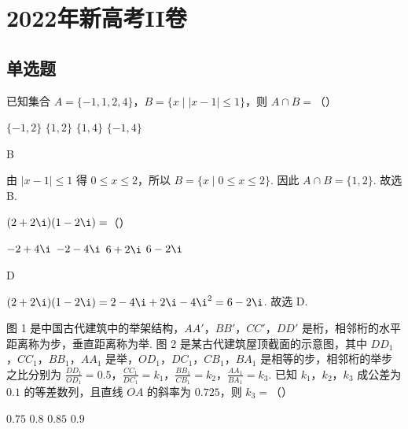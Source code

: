 
\chapter{2022年新高考II卷}

\section{单选题}

\begin{problem}
已知集合 \(A=\{-1,1,2,4\}\)，\(B=\{x\mid |x-1|\le 1\}\)，则 \(A\cap B=\)（\quad）

\choices
    {\(\{-1,2\}\)}
    {\(\{1,2\}\)}
    {\(\{1,4\}\)}
    {\(\{-1,4\}\)}
\end{problem}

\begin{answer}
B
\end{answer}

\begin{solution}
由 \(\left|x-1\right|\le 1\) 得 \(0\le x\le 2\)，所以
\(B=\{x\mid 0\le x\le 2\}\). 因此
\(A\cap B=\{1,2\}\).
故选 B.
\end{solution}


\begin{problem}
\((2+2\i)(1-2\i)=\)（\quad）

\choices
    {\(-2+4\i\)}
    {\(-2-4\i\)}
    {\(6+2\i\)}
    {\(6-2\i\)}
\end{problem}

\begin{answer}
D
\end{answer}

\begin{solution}
\((2+2\i)(1-2\i)=2-4\i+2\i-4\i^2=6-2\i\).
故选 D.
\end{solution}


\begin{problem}
图 1 是中国古代建筑中的举架结构，\(AA'\)，\(BB'\)，\(CC'\)，\(DD'\) 是桁，相邻桁的水平距离称为步，垂直距离称为举. 图 2 是某古代建筑屋顶截面的示意图，其中 \(DD_1\)，\(CC_1\)，\(BB_1\)，\(AA_1\) 是举，\(OD_1\)，\(DC_1\)，\(CB_1\)，\(BA_1\) 是相等的步，相邻桁的举步之比分别为 \(\frac{DD_1}{OD_1}=0.5\)，\(\frac{CC_1}{DC_1}=k_1\)，\(\frac{BB_1}{CB_1}=k_2\)，\(\frac{AA_1}{BA_1}=k_3\).
已知 \(k_1\)，\(k_2\)，\(k_3\) 成公差为 \(0.1\) 的等差数列，且直线 \(OA\) 的斜率为 \(0.725\)，则 \(k_3=\)（\quad）


\choices
    {\(0.75\)}
    {\(0.8\)}
    {\(0.85\)}
    {\(0.9\)}
\end{problem}


